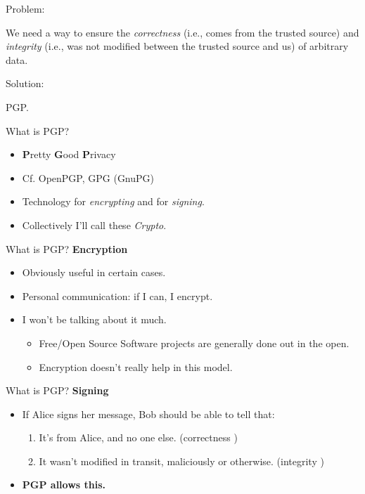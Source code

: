 \documentclass{beamer}
\begin{document}
\begin{frame}{}
  Problem:

  \begin{center}
    \Large We need a way to ensure the \textit{correctness} (i.e.,
    comes from the trusted source) and \textit{integrity} (i.e., was
    not modified between the trusted source and us) of arbitrary
    data.
  \end{center}
\end{frame}

\begin{frame}{}
  Solution:

  \begin{center}
    \Huge PGP.
  \end{center}
\end{frame}

\begin{frame}{What is PGP?}
  \begin{itemize}
  \item \textbf{P}retty \textbf{G}ood \textbf{P}rivacy
  \item Cf. OpenPGP, GPG (GnuPG)
  \item Technology for \textit{encrypting} and for \textit{signing}.
  \item Collectively I'll call these \textit{Crypto}.
  \end{itemize}
\end{frame}

\begin{frame}{What is PGP?}
  \textbf{Encryption}

  \begin{itemize}
  \item Obviously useful in certain cases.
  \item Personal communication: if I can, I encrypt.
  \item I won't be talking about it much.
    \begin{itemize}
    \item Free/Open Source Software projects are generally done out in
      the open.
    \item Encryption doesn't really help in this model.
    \end{itemize}
  \end{itemize}
\end{frame}

\begin{frame}{What is PGP?}
  \textbf{Signing}

  \begin{itemize}
    \item If Alice signs her message, Bob should be able to tell that:
      \begin{enumerate}
      \item It's from Alice, and no one else. (correctness \checkmark)
      \item It wasn't modified in transit, maliciously or
        otherwise. (integrity \checkmark)
      \end{enumerate}
    \item\textbf{PGP allows this.}
    \end{itemize}
\end{frame}
\end{document}
